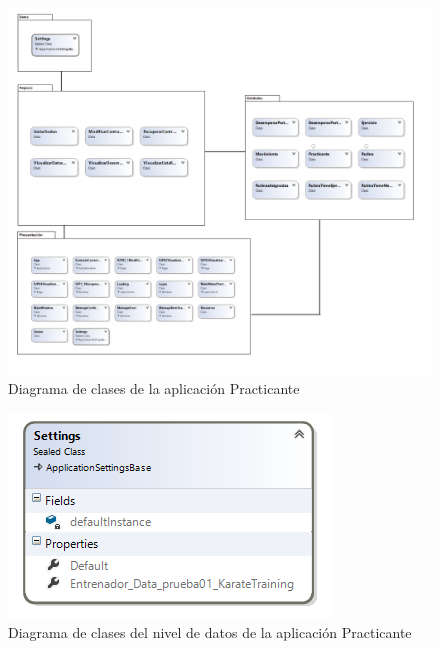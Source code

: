 \begin{figure}[H]
	\begin{center}
		\includegraphics[scale=0.55]{./Figuras/Arquitectura/DiagramadeclasesPracticante}
	\end{center}
	\caption{Diagrama de clases de la aplicación Practicante}
	\label{fig:DC_practicante}
\end{figure}

\begin{figure}[H]
	\begin{center}
		\includegraphics[scale=1]{./Figuras/Arquitectura/Datos_Practicante}
	\end{center}
	\caption{Diagrama de clases del nivel de datos de la aplicación Practicante}
	\label{fig:DCP_Datos}
\end{figure}

